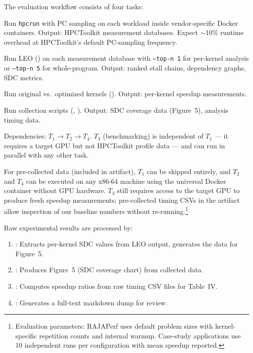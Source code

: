 \documentclass[conference]{IEEEtran}
\begin{document}
\artcomp

The evaluation workflow consists of four tasks:

\begin{IEEEdescription}
\item[$T_1$: Profile] Run \texttt{hpcrun} with PC sampling on each workload inside vendor-specific Docker containers. Output: HPCToolkit measurement databases. Expect $\sim$10\% runtime overhead at HPCToolkit's default PC-sampling frequency.
\item[$T_2$: Analyze] Run LEO () on each measurement database with \texttt{--top-n~1} for per-kernel analysis or \texttt{--top-n~5} for whole-program. Output: ranked stall chains, dependency graphs, SDC metrics.
\item[$T_3$: Benchmark] Run original vs.\ optimized kernels (). Output: per-kernel speedup measurements.
\item[$T_4$: Collect] Run collection scripts (, ). Output: SDC coverage data (Figure~5), analysis timing data.
\end{IEEEdescription}

Dependencies: $T_1 \rightarrow T_2 \rightarrow T_4$. $T_3$ (benchmarking) is independent of $T_1$ --- it requires a target GPU but not HPCToolkit profile data --- and can run in parallel with any other task.

For pre-collected data (included in artifact), $T_1$ can be skipped entirely, and $T_2$ and $T_4$ can be executed on any x86-64 machine using the universal Docker container without GPU hardware. $T_3$ still requires access to the target GPU to produce fresh speedup measurements; pre-collected timing CSVs in the artifact allow inspection of our baseline numbers without re-running.\footnote{Evaluation parameters: RAJAPerf uses default problem sizes with kernel-specific repetition counts and internal warmup. Case-study applications use 10 independent runs per configuration with mean speedup reported.}

\artout

Raw experimental results are processed by:
\begin{enumerate}
\item {}: Extracts per-kernel SDC values from LEO output, generates the data for Figure~5.
\item {}: Produces Figure~5 (SDC coverage chart) from collected data.
\item {}: Computes speedup ratios from raw timing CSV files for Table~IV.
\item {}: Generates a full-text markdown dump for review.
\end{enumerate}
\end{document}
